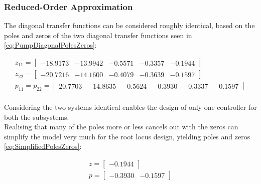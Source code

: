 \subsubsection{Reduced-Order Approximation}
The diagonal transfer functions can be considered roughly identical, based on the poles and zeros of the two diagonal transfer functions seen in \cref{eq:PumpDiagonalPolesZeros}: 

\begin{equation}\label{eq:PumpDiagonalPolesZeros}
	\begin{gathered}
		z_{11} = \begin{bmatrix}-18.9173&  -13.9942&   -0.5571&   -0.3357&   -0.1944 \end{bmatrix} \\
		z_{22} = \begin{bmatrix}-20.7216&  -14.1600&   -0.4079&   -0.3639&   -0.1597 \end{bmatrix} \\
		p_{11} = p_{22} = \begin{bmatrix} 20.7703&  -14.8635&   -0.5624&   -0.3930&   -0.3337&   -0.1597 \end{bmatrix} \\
	\end{gathered}
\end{equation}

Considering the two systems identical enables the design of only one controller for both the subsystems.\\
Realising that many of the poles more or less cancels out with the zeros can simplify the model very much for the root locus design, yielding poles and zeros \cref{eq:SimplifiedPolesZeros}:

 \begin{equation}\label{eq:SimplifiedPolesZeros}
 	\begin{gathered}
 		z = \begin{bmatrix}  -0.1944 \end{bmatrix} \\
 		p = \begin{bmatrix}  -0.3930&  -0.1597 \end{bmatrix} \\
 	\end{gathered}
 \end{equation}

